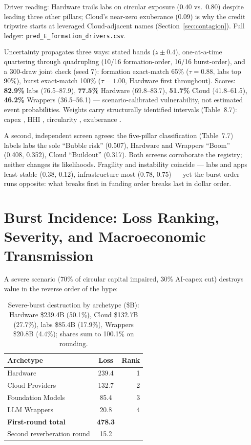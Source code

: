 \documentclass[11pt,a4paper]{article}
\begin{document}
Driver reading: Hardware trails labs on circular exposure (0.40 vs.\ 0.80)
despite leading three other pillars; Cloud's near-zero exuberance (0.09)
is why the credit tripwire starts at leveraged Cloud-adjacent names
(Section~\ref{sec:contagion}). Full ledger: \texttt{pred\_E\_formation\_drivers.csv}.

Uncertainty propagates three ways: stated bands ($z\pm0.4$), one-at-a-time
quartering through quadrupling (10/16 formation-order, 16/16 burst-order),
and a 300-draw joint check (seed 7): formation exact-match 65\%
($\tau=0.88$, labs top 90\%), burst exact-match 100\% ($\tau=1.00$,
Hardware first throughout). Scores: \textbf{82.9\%} labs (76.5--87.9),
\textbf{77.5\%} Hardware (69.8--83.7), \textbf{51.7\%} Cloud (41.8--61.5),
\textbf{46.2\%} Wrappers (36.5--56.1) --- scenario-calibrated
vulnerability, not estimated event probabilities. Weights carry
structurally identified intervals (Table~8.7): capex \AeightCapex{}, HHI
\AeightHhi{}, circularity \AeightCirc{}, exuberance \AeightExub{}.

A second, independent screen agrees: the five-pillar classification
(Table~7.7) labels labs the sole ``Bubble risk'' (0.507), Hardware and
Wrappers ``Boom'' (0.408, 0.352), Cloud ``Buildout'' (0.317). Both screens
corroborate the registry; neither changes its likelihoods. Fragility and
instability coincide --- labs and apps least stable (0.38, 0.12),
infrastructure most (0.78, 0.75) --- yet the burst order runs opposite:
what breaks first in funding order breaks last in dollar order.

\section{Burst Incidence: Loss Ranking, Severity, and Macroeconomic Transmission}\label{sec:burst}
A severe scenario (70\% of circular capital impaired, 30\% AI-capex cut)
destroys value in the reverse order of the hype:

\begin{table}[htbp]
\centering
\caption{Severe-burst destruction by archetype (\$B): Hardware \$239.4B (50.1\%), Cloud \$132.7B (27.7\%), labs \$85.4B (17.9\%), Wrappers \$20.8B (4.4\%); shares sum to 100.1\% on rounding.}
    \label{tab:08-severeburst-destruction-by-archetype}
\begin{tabular}{lcr}
\toprule
Archetype & Loss & Rank \\
\midrule
Hardware & 239.4 & 1 \\
Cloud Providers & 132.7 & 2 \\
Foundation Models & 85.4 & 3 \\
LLM Wrappers & 20.8 & 4 \\
\midrule
\textbf{First-round total} & \textbf{478.3} & \\
Second reverberation round & 15.2 & \\
\bottomrule
\end{tabular}
\end{table}
\end{document}
